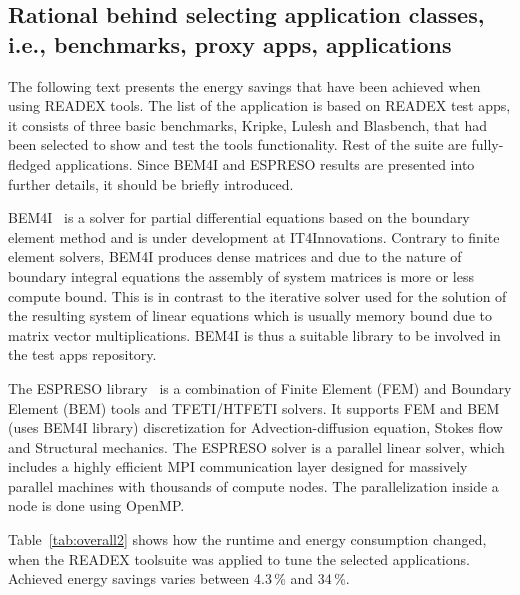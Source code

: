 

\subsection{Rational behind selecting application classes, i.e., benchmarks, proxy apps, applications}

The following text presents the energy savings that have been achieved when using READEX tools. The list of the application is based on READEX test apps, it consists of three basic benchmarks, Kripke, Lulesh and Blasbench, that had been selected to show and test the tools functionality. Rest of the suite are fully-fledged applications. Since BEM4I and ESPRESO results are presented into further details, it should be briefly introduced. 

BEM4I~\cite{ch6_MerZap2013} is a solver for partial differential equations based on the boundary element method and is under development at IT4Innovations. Contrary to finite element solvers, BEM4I produces dense matrices and due to the nature of boundary integral equations the assembly of system matrices is more or less compute bound. This is in contrast to the iterative solver used for the solution of the resulting system of linear equations which is usually memory bound due to matrix vector multiplications. BEM4I is thus a suitable library to be involved in the test apps repository.

The ESPRESO library~\cite{ESPRESOijhpca} is a combination of Finite Element (FEM) and Boundary Element (BEM) tools and TFETI/HTFETI solvers. It supports FEM and BEM (uses BEM4I library) discretization for Advection-diffusion equation, Sto\-kes flow and Structural mechanics. The ESPRESO solver is a parallel linear solver, which includes a highly efficient MPI communication layer designed for massively parallel machines with thousands of compute nodes. The parallelization inside a node is done using OpenMP.

Table~\ref{tab:overall2} shows how the runtime and energy consumption changed, when the READEX toolsuite was applied to tune the selected applications. Achieved energy savings varies between 4.3\,\% and 34\,\%. 


